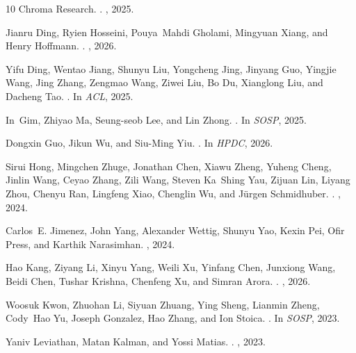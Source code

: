 \begin{thebibliography}{10}
{Chroma Research}.
.
, 2025.

Jianru Ding, Ryien Hosseini, Pouya~Mahdi Gholami, Mingyuan Xiang, and Henry
  Hoffmann.
.
, 2026.

Yifu Ding, Wentao Jiang, Shunyu Liu, Yongcheng Jing, Jinyang Guo, Yingjie
  Wang, Jing Zhang, Zengmao Wang, Ziwei Liu, Bo Du, Xianglong Liu, and
  Dacheng Tao.
.
\newblock In {\em ACL}, 2025.

In~Gim, Zhiyao Ma, Seung-seob Lee, and Lin Zhong.
.
\newblock In {\em SOSP}, 2025.

Dongxin Guo, Jikun Wu, and Siu-Ming Yiu.
.
\newblock In {\em HPDC}, 2026.

Sirui Hong, Mingchen Zhuge, Jonathan Chen, Xiawu Zheng, Yuheng Cheng, Jinlin
  Wang, Ceyao Zhang, Zili Wang, Steven Ka~Shing Yau, Zijuan Lin, Liyang Zhou,
  Chenyu Ran, Lingfeng Xiao, Chenglin Wu, and J{\"u}rgen Schmidhuber.
.
, 2024.

Carlos~E. Jimenez, John Yang, Alexander Wettig, Shunyu Yao, Kexin Pei, Ofir
  Press, and Karthik Narasimhan.
, 2024.

Hao Kang, Ziyang Li, Xinyu Yang, Weili Xu, Yinfang Chen, Junxiong Wang, Beidi
  Chen, Tushar Krishna, Chenfeng Xu, and Simran Arora.
.
, 2026.

Woosuk Kwon, Zhuohan Li, Siyuan Zhuang, Ying Sheng, Lianmin Zheng, Cody~Hao Yu,
  Joseph Gonzalez, Hao Zhang, and Ion Stoica.
.
\newblock In {\em SOSP}, 2023.

Yaniv Leviathan, Matan Kalman, and Yossi Matias.
.
, 2023.


\end{thebibliography}

